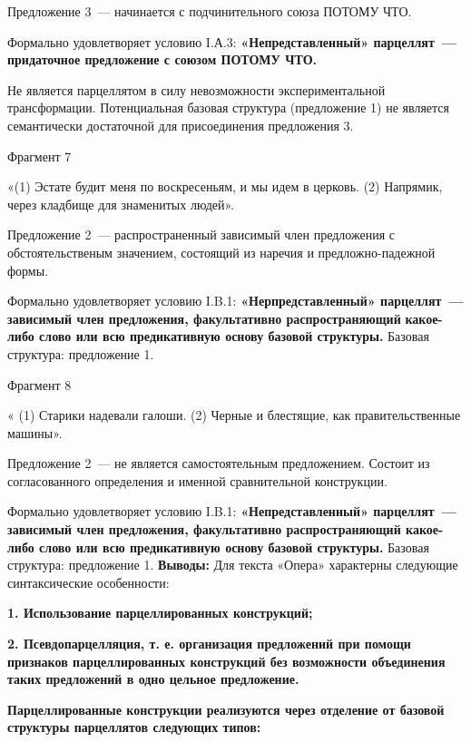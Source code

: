 \documentclass{kursa4}
\begin{document}
{     Предложение 3~--- начинается с подчинительного союза ПОТОМУ ЧТО. 

     Формально удовлетворяет условию I.А.3: \textbf{«Непредставленный»
      парцеллят~--- придаточное предложение с союзом ПОТОМУ ЧТО.} 

     Не является парцеллятом в силу невозможности экспериментальной
      трансформации. Потенциальная базовая структура (предложение 1) не
      является семантически достаточной для присоединения предложения 3. 

     Фрагмент 7

     «(1) Эстате будит меня по воскресеньям, и мы идем в церковь. (2)
      Напрямик, через кладбище для знаменитых людей».

     Предложение 2~--- распространенный зависимый член предложения с
      обстоятельственым значением, состоящий из наречия и предложно-падежной
      формы. 

     Формально удовлетворяет условию I.B.1:
      \textbf{«}\textbf{Нерпредставленный» парцеллят~--- зависимый член
      предложения, факультативно распространяющий }\textbf{какое-либо слово
      или всю предикативную основу базовой структуры. }Базовая структура:
      предложение 1.

     Фрагмент 8

     « (1) Старики надевали галоши. (2) Черные и блестящие, как
      правительственные машины».

     Предложение 2~--- не является самостоятельным предложением. Состоит из
      согласованного определения и именной сравнительной конструкции.

     Формально удовлетворяет условию I.B.1:
      \textbf{«}\textbf{Непредставленный» парцеллят~--- зависимый член
      предложения, факультативно распространяющий какое-либо слово или всю
      предикативную основу базовой структуры.} Базовая структура: предложение 1.
     \textbf{Выводы:} \textmd{Для текста «Опера» характерны следующие
      синтаксические особенности:}

      {\bfseries\color[rgb]{0.2,0.2,0.2}
      \textmd{1. Использование парцеллированных конструкций;}}

      {\bfseries\color[rgb]{0.2,0.2,0.2}
      \textmd{2. Псевдопарцелляция, т. е. организация предложений при
      помощи признаков парцеллированных конструкций }\textmd{без возможности
      объединения таких предложений в одно цельное предложение.}}

      {\bfseries\color[rgb]{0.2,0.2,0.2}
      \textmd{}Парцеллированные конструкции\textmd{ }\textmd{реализуются
      через отделение от базовой структуры парцеллятов следующих
      типов}\textmd{:}}

}
\end{document}
